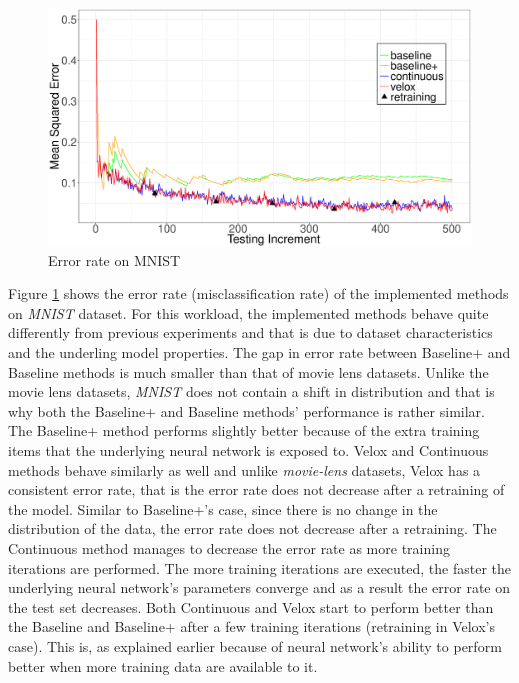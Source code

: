 \documentclass{vldb}
\begin{document}
\begin{figure}[h]
 \centering
 \includegraphics[width=\columnwidth]{../images/experiment-results/mnist-quality.eps}
 \caption{Error rate on MNIST}
 \label{fig:mnist-quality}
 \end{figure}
 
Figure \ref{fig:mnist-quality} shows the error rate (misclassification rate) of the implemented methods on \textit{MNIST} dataset.
For this workload, the implemented methods behave quite differently from previous experiments and that is due to dataset characteristics and the underling model properties.
The gap in error rate between Baseline+ and Baseline methods is much smaller than that of movie lens datasets.
Unlike the movie lens datasets, \textit{MNIST} does not contain a shift in distribution and that is why both the Baseline+ and Baseline methods' performance is rather similar.
The Baseline+ method performs slightly better because of the extra training items that the underlying neural network is exposed to.
Velox and Continuous methods behave similarly as well and unlike \textit{movie-lens} datasets, Velox has a consistent error rate, that is the error rate does not decrease after a retraining of the model.
Similar to Baseline+'s case, since there is no change in the distribution of the data, the error rate does not decrease after a retraining.
The Continuous method manages to decrease the error rate as more training iterations are performed.
The more training iterations are executed, the faster the underlying neural network's parameters converge and as a result the error rate on the test set decreases.
Both Continuous and Velox start to perform better than the Baseline and Baseline+ after a few training iterations (retraining in Velox's case).
This is, as explained earlier because of neural network's ability to perform better when more training data are available to it.
\end{document}
